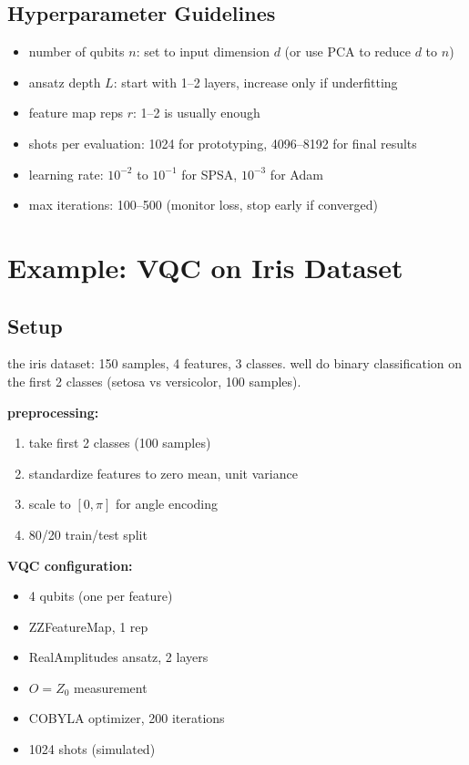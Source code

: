 \documentclass[11pt,a4paper]{article}
\theoremstyle{definition}
\theoremstyle{remark}
\begin{document}
\subsection{Hyperparameter Guidelines}

\begin{itemize}
    \item number of qubits $n$: set to input dimension $d$ (or use PCA to reduce $d$ to $n$)
    \item ansatz depth $L$: start with 1--2 layers, increase only if underfitting
    \item feature map reps $r$: 1--2 is usually enough
    \item shots per evaluation: 1024 for prototyping, 4096--8192 for final results
    \item learning rate: $10^{-2}$ to $10^{-1}$ for SPSA, $10^{-3}$ for Adam
    \item max iterations: 100--500 (monitor loss, stop early if converged)
\end{itemize}

\section{Example: VQC on Iris Dataset}

\subsection{Setup}

the iris dataset: 150 samples, 4 features, 3 classes. well do binary classification on the first 2 classes (setosa vs versicolor, 100 samples).

\textbf{preprocessing:}
\begin{enumerate}
    \item take first 2 classes (100 samples)
    \item standardize features to zero mean, unit variance
    \item scale to $[0, \pi]$ for angle encoding
    \item 80/20 train/test split
\end{enumerate}

\textbf{VQC configuration:}
\begin{itemize}
    \item 4 qubits (one per feature)
    \item ZZFeatureMap, 1 rep
    \item RealAmplitudes ansatz, 2 layers
    \item $O = Z_0$ measurement
    \item COBYLA optimizer, 200 iterations
    \item 1024 shots (simulated)
\end{itemize}
\end{document}
